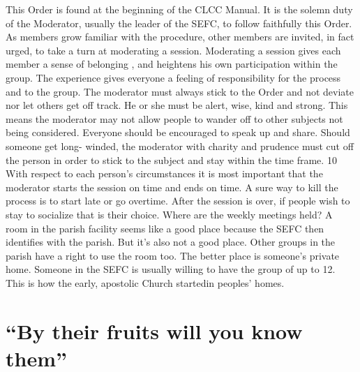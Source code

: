 \documentclass{article}        %
\begin{document}
This Order is found at the beginning of the CLCC Manual. It is the solemn duty
of the Moderator, usually the leader of the SEFC, to follow faithfully this
Order. As members grow familiar with the procedure, other members are invited,
in fact urged, to take a turn at moderating a session. Moderating a session
gives each member a sense of belonging , and heightens his own participation
within the group. The experience gives everyone a feeling of responsibility for
the process and to the group.
The moderator must always stick to the Order and not deviate nor let others get
off track. He or she must be alert, wise, kind and strong. This means the
moderator may not allow people to wander off to other subjects not being
considered. Everyone should be encouraged to speak up and share. Should someone
get long- winded, the moderator with charity and prudence must cut off the
person in order to stick to the subject and stay within the time frame.
10
With respect to each person's circumstances it is most important that the
moderator starts the session on time and ends on time. A sure way to kill the
process is to start late or go overtime. After the session is over, if people
wish to stay to socialize that is their choice.
Where are the weekly meetings held? A room in the parish facility seems like a
good place because the SEFC then identifies with the parish. But it's also not a
good place. Other groups in the parish have a right to use the room too. The
better place is someone's private home. Someone in the SEFC is usually willing
to have the group of up to 12. This is how the early, apostolic Church startedin
peoples' homes.

\section{``By their fruits will you know them''}
\end{document}

